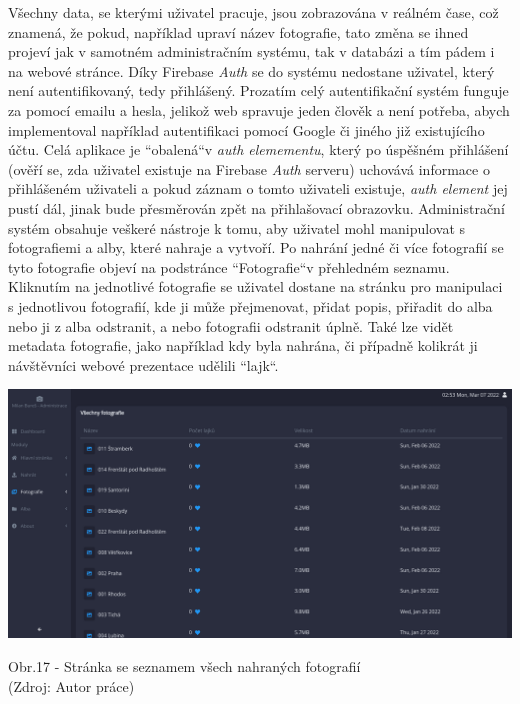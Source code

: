\documentclass[12pt,a4paper]{report}
\begin{document}
  Všechny data, se kterými uživatel pracuje, jsou zobrazována v reálném čase, což znamená, že
  pokud, například upraví název fotografie, tato změna se ihned projeví jak v samotném
  administračním systému, tak v databázi a tím pádem i na webové stránce.
  Díky Firebase \emph{Auth} se do systému nedostane uživatel, který není autentifikovaný, tedy přihlášený.
  Prozatím celý autentifikační systém funguje za pomocí emailu a hesla, jelikož web spravuje jeden
  člověk a není potřeba, abych implementoval například autentifikaci pomocí Google či jiného již
  existujícího účtu.
  Celá aplikace je ``obalená``\space v \emph{auth elemementu}, který po úspěšném přihlášení (ověří se, zda
  uživatel existuje na Firebase \emph{Auth} serveru) uchovává informace o přihlášeném uživateli a pokud
  záznam o tomto uživateli existuje, \emph{auth element} jej pustí dál, jinak bude přesměrován zpět na
  přihlašovací obrazovku.
  Administrační systém obsahuje veškeré nástroje k tomu, aby uživatel mohl manipulovat s
  fotografiemi a alby, které nahraje a vytvoří. Po nahrání jedné či více fotografií se tyto fotografie
  objeví na podstránce ``Fotografie``\space v přehledném seznamu. Kliknutím na jednotlivé fotografie se
  uživatel dostane na stránku pro manipulaci s jednotlivou fotografií, kde ji může přejmenovat,
  přidat popis, přiřadit do alba nebo ji z alba odstranit, a nebo fotografii odstranit úplně. Také lze
  vidět metadata fotografie, jako například kdy byla nahrána, či případně kolikrát ji návštěvníci
  webové prezentace udělili ``lajk``.

  \vspace*{0.5cm}
  \noindent\includegraphics[width=\linewidth]{allPhotos.png}
  \begin{center}
    Obr.17 - Stránka se seznamem všech nahraných fotografií \\
    (Zdroj: Autor práce)
  \end{center}
  \vspace*{0.5cm}
\end{document}
